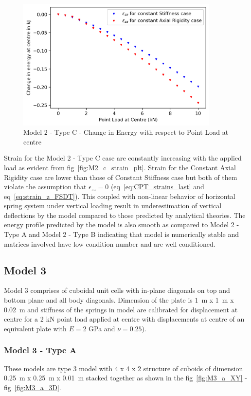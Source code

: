 \begin{figure}[!htbp]
    \centering
    \includegraphics[width = 0.9\textwidth]{Figures/M2_c_energy.png}
    \caption{Model 2 - Type C - Change in Energy with respect to Point Load at centre}
    \label{fig:M2_c_energy}
\end{figure}

Strain for the Model 2 - Type C case are constantly increasing with the applied load as evident from fig~\ref{fig:M2_c_strain_plt}. Strain for the Constant Axial Rigidity case are lower than those of Constant Stiffness case but both of them violate the assumption that $\epsilon_{zz} = 0$ (eq~\ref{eq:CPT_strains_last} and eq~\ref{eq:strain_z_FSDT}). This coupled with non-linear behavior of horizontal spring system under vertical loading result in underestimation of vertical deflections by the model compared to those predicted by analytical theories. The energy profile predicted by the model is also smooth as compared to Model 2 - Type A and Model 2 - Type B indicating that model is numerically stable and matrices involved have low condition number and are well conditioned.

\newpage
\subsection{Model 3}
Model 3 comprises of cuboidal unit cells with in-plane diagonals on top and bottom plane and all body diagonals. Dimension of the plate is 1~m x 1~m x 0.02~m and stiffness of the springs in model are calibrated for displacement at centre for a 2 kN point load applied at centre with displacements at centre of an equivalent plate with $E = 2$ GPa and $\nu = 0.25$).

\subsubsection{Model 3 - Type A}
These models are type 3 model with 4 x 4 x 2 structure of cuboids of dimension 0.25~m x 0.25~m x 0.01~m stacked together as shown in the fig~\ref{fig:M3_a_XY} - fig~\ref{fig:M3_a_3D}.

